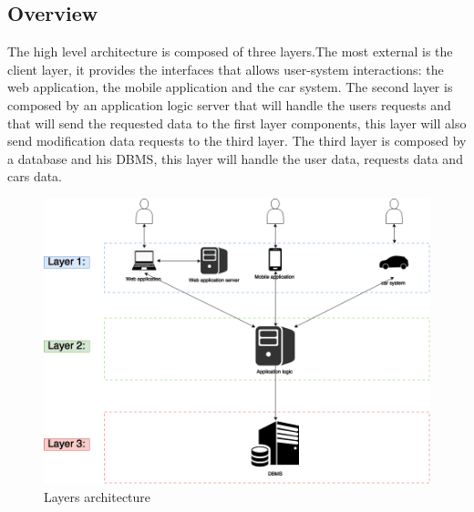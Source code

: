 \subsection{Overview}

The high level architecture is composed of three layers.The most external is the client layer, it provides the interfaces that allows user-system interactions: the web application, the mobile application and the car system. The second layer is composed by an application logic server that will handle the users requests and that will send the requested data to the first layer components, this layer will also send modification data requests to the third layer. The third layer is composed by a database and his DBMS, this layer will handle the user data, requests data and cars data.

\begin{figure}[hp]
\centering
\includegraphics[width=470 pt]{resources/Architectural_structure.png}
\caption{\label{fig:layer}Layers architecture}
\end{figure}

\newpage

